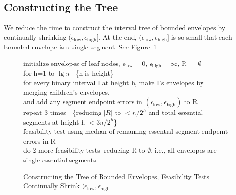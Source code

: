 \documentclass[11pt]{article}
\newlength{\Ainlength}
\newlength{\Ainindent}
\newlength{\Aintemp}
\newcommand{\Ain}[1]{\setlength{\Aintemp}{\Ainindent}\addtolength{\Aintemp}{#1\Ainlength} \hspace*{\Aintemp}}
\newcommand{\epslow}{\ensuremath{\epsilon_\mathrm{low}}}
\newcommand{\epshigh}{\ensuremath{\epsilon_\mathrm{high}}}
\newcommand{\epsinterval}[1]{\ensuremath{(\epslow,\epshigh#1}}
\begin{document}
\subsection{Constructing the Tree}

We reduce the time to construct the interval tree of bounded envelopes by continually shrinking \epsinterval{]}.
At the end, \epsinterval{]} is so small that each bounded envelope is a single segment.
See Figure~\ref{fig:constructingtree}.

\begin{figure}
\setlength{\Ainindent}{0.4in}

\noindent
\textsf{\small
\hspace*{-0.08in}
\Ain{0} initialize envelopes of leaf nodes, $\epslow=0$, $\epshigh=\infty$, R $= \emptyset$\\
\Ain{0} for h=1 to $\lg n$~ \{h is height\}\\
\Ain{1}    for every binary interval I at height h, make I's envelopes by merging children's envelopes,\\
\Ain{2} and add any segment endpoint errors in \epsinterval{)} to R\\
\Ain{1} repeat 3 times~~\{reducing $|R|$ to $< n/2^{h}$ and total essential segments at height h $< 3n/2^h$\}\\
\Ain{2}    feasibility test using median of remaining essential segment endpoint errors in R\\
\Ain{0} do 2 more feasibility tests, reducing R to $\emptyset$, i.e., all envelopes are single essential segments
}

\caption{Constructing the Tree of Bounded Envelopes, Feasibility Tests Continually Shrink \epsinterval{]}} \label{fig:constructingtree}
\vspace*{-0.08in}
\hrulefill
\vspace*{-0.1in}
\end{figure}
\end{document}
